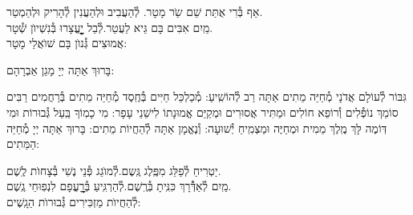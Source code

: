\documentclass[twoside, openany, parskip=half, 11pt]{book}
\begin{document}


אַף בְּ֯רִי אֻתַּת שֵׁם שַֹר מָטָר. \hfill לְ֯הַעֲבִיב וּלְהַעֲנִין לְ֯הָרִיק וּלְהַמְטַר.\\
מַֽיִם אִבִּים בָּם גֵּיא לַעֲטַר.\hfill לְ֯בַל יׇׇׇׇׇׇׇׇׇׇׇׇעֳצָרוּ בְּ֯נִשְׁיוׂן שְׁ֯טָר.\\
אֲמוּצִים גְּ֯נוׂן בָּם שׁוׂאֲלֵי מָטָר:



בָּרוּךְ אַתָּה יְיָ מָגֵן אַבְרָהָם:

גִּבּוֹר לְ֯עוֹלָם אֲדֹנָי מְ֯חַיֵּה מֵתִים אַתָּה רַב לְ֯הוֹשִֽׁיעַ: מְ֯כַלְכֵּל חַיִּים בְּ֯חֶֽסֶד מְ֯חַיֵּה מֵתִים בְּ֯רַחֲמִים רַבִּים סוֹמֵךְ נוֹפְ֯לִים וְ֯רוֹפֵא חוֹלִים וּמַתִּיר אֲסוּרִים וּמְקַיֵּם אֱמוּנָתוֹ לִישֵׁנֵי עָפָר: מִי כָמֽוֹךָ בַּֽעַל גְּ֯בוּרוֹת וּמִי דּֽוֹמֶה לָּךְ מֶֽלֶךְ מֵמִית וּמְחַיֶּה וּמַצְמִֽיחַ יְ֯שׁוּעָה: וְ֯נֶאֱמָן אַתָּה לְ֯הַחֲיוֹת מֵתִים: בָּרוּךְ אַתָּה יְיָ מְ֯חַיֵּה הַמֵּתִים:





יַטְרִיחַ לְ֯פַלֵּג מִפֶּֽלֶג גֶּֽשֶם.\hfill לְ֯מוׂגֵג פְּ֯נֵי נֶשִׁי בְּ֯צָחוׂת לֶֽשֶׁם.\\
מַֽיִם לְ֯אַדְּ֯֯רָךְ כִּנִּֽיתָ בְּ֯רֶֽשֶׁם.\hfill לְ֯הַרְגִּֽיעַ בְּ֯רׇׇׇׇׇׇׇׇעֳפָם לִנְפֽוּחֵי גֶֽשֶׁם.\\
לְ֯הַחֲיוׂת מַזְכִּירִים גְּ֯בוּרוׂת הַגָֽשֶׁים:
\end{document}
